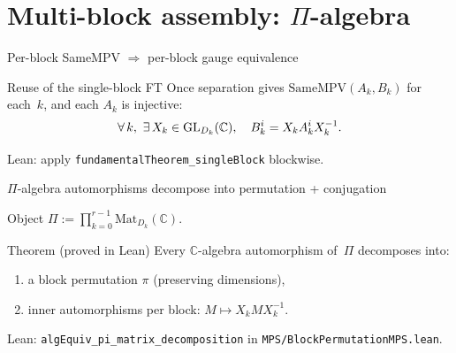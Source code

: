 \documentclass[aspectratio=169,10pt]{beamer}
\newcommand{\Mat}{\mathrm{Mat}}
\begin{document}
\section{\texorpdfstring{Multi-block assembly: $\Pi$-algebra}{Multi-block assembly: Pi-algebra}}

\begin{frame}{Per-block SameMPV $\Rightarrow$ per-block gauge equivalence}
    \vspace{-0.6em}

    \begin{block}{Reuse of the single-block FT}
        Once separation gives $\mathrm{SameMPV}(A_k,B_k)$ for each~$k$,
        and each $A_k$ is injective:
        \[
            \forall\, k,\  \exists\, X_k\in\mathrm{GL}_{D_k}(\mathbb{C}),\quad B_k^i=X_k A_k^i X_k^{-1}.
        \]
    \end{block}

    \textcolor{dimwhite}{\footnotesize Lean: apply \texttt{fundamentalTheorem\_singleBlock} blockwise.}
\end{frame}

\begin{frame}{\texorpdfstring{$\Pi$-algebra automorphisms decompose into permutation + conjugation}{Pi-algebra automorphisms decompose into permutation + conjugation}}
    \vspace{-0.6em}

    \begin{block}{Object}
        $\Pi := \prod_{k=0}^{r-1} \Mat_{D_k}(\mathbb{C})$.
    \end{block}

    \begin{block}{Theorem (proved in Lean)}
        Every $\mathbb{C}$-algebra automorphism of~$\Pi$ decomposes into:
        \begin{enumerate}\itemsep0.2em
            \item a block permutation $\pi$ (preserving dimensions),
            \item inner automorphisms per block: $M\mapsto X_k M X_k^{-1}$.
        \end{enumerate}
    \end{block}

    \textcolor{dimwhite}{\footnotesize Lean: \texttt{algEquiv\_pi\_matrix\_decomposition} in \texttt{MPS/BlockPermutationMPS.lean}.}
\end{frame}
\end{document}
